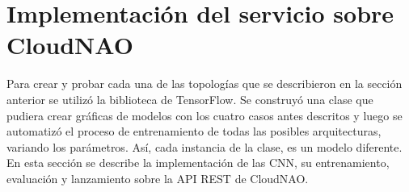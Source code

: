 %
%
%
%
%
%
%

%

\section{Implementación del servicio sobre CloudNAO}



Para crear y probar cada una de las topologías que se
describieron en la sección anterior se utilizó la biblioteca
de TensorFlow.
Se construyó una clase que pudiera crear gráficas de modelos
con los cuatro casos antes descritos y luego se automatizó el proceso de
entrenamiento de todas las posibles arquitecturas, variando los parámetros.
Así, cada instancia de la clase, es un modelo diferente. En esta sección se 
describe la implementación de las CNN, su entrenamiento, evaluación
y lanzamiento sobre la API REST de CloudNAO.


